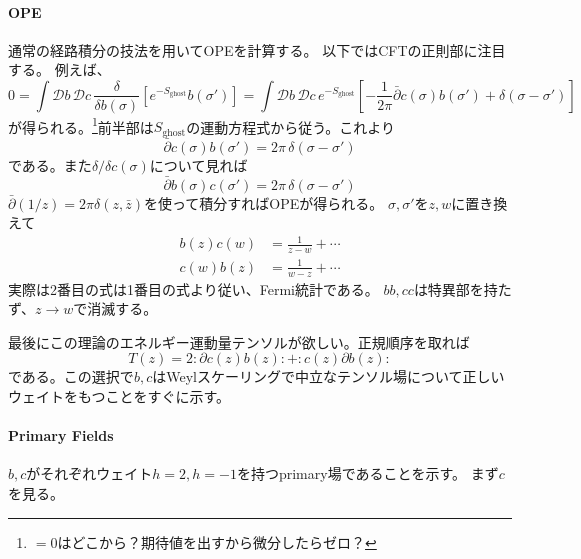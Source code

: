 \documentclass[10pt]{jsarticle}
\newcommand{\kkakko}[1]{\left[ #1 \right]} %
\newcommand{\del}{{\partial}} %
\newcommand{\pms}[1]{\mathcal{D}#1\,}%
\begin{document}
\paragraph{OPE}
通常の経路積分の技法を用いてOPEを計算する。
以下ではCFTの正則部に注目する。
例えば、
\begin{equation}
  0=\int \pms{b}\pms{c}\frac{\delta }{\delta b(\sigma)}\kkakko{e^{-S_{\mathrm{ghost}}}b(\sigma')}=\int \pms{b}\pms{c}e^{-S_{\mathrm{ghost}}}\kkakko{-\frac{1}{2\pi}\bar{\del }c(\sigma)b(\sigma')+\delta(\sigma-\sigma')}
\end{equation}
が得られる。\footnote{$=0$はどこから？期待値を出すから微分したらゼロ？}前半部は$S_{\mathrm{ghost}}$の運動方程式から従う。これより
\begin{equation}
  \bar{\del}c(\sigma)b(\sigma')=2\pi\, \delta (\sigma-\sigma')
\end{equation}
である。また$\delta /\delta c(\sigma)$について見れば
\begin{equation}
  \bar{\del}b(\sigma)c(\sigma')=2\pi\, \delta (\sigma-\sigma')
\end{equation}
$\bar{\del}(1/z)=2\pi\delta (z,\bar{z})$を使って積分すればOPEが得られる。
$\sigma,\sigma'$を$z,w$に置き換えて
\begin{align}
\label{opebc} b(z)c(w)&=\frac{1}{z-w}+\cdots \\
\label{opecb}  c(w)b(z)&=\frac{1}{w-z}+\cdots 
\end{align}
実際は2番目の式は1番目の式より従い、Fermi統計である。
$bb,cc$は特異部を持たず、$z \to w$で消滅する。

最後にこの理論のエネルギー運動量テンソルが欲しい。正規順序を取れば
\begin{equation}
  T(z)=2:\del c(z)b(z):+:c(z)\del b(z):
\end{equation}
である。この選択で$b,c$はWeylスケーリングで中立なテンソル場について正しいウェイトをもつことをすぐに示す。


\paragraph{Primary Fields}
$b,c$がそれぞれウェイト$h=2,h=-1$を持つprimary場であることを示す。
まず$c$を見る。
\end{document}

